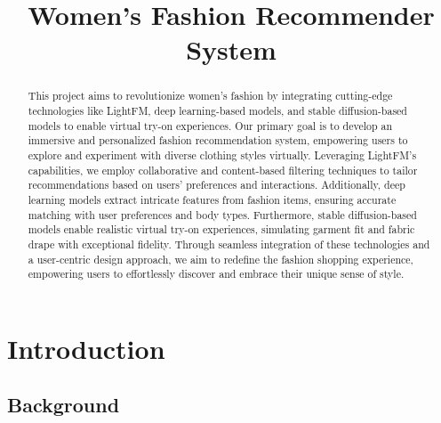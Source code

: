 \documentclass[conference]{IEEEtran}
\begin{document}
\setlength{\parskip}{10pt}

\title{Women's Fashion Recommender System}

\author{
\and

\and

\and
{}
}

\maketitle

\begin{abstract}
This project aims to revolutionize women's fashion by integrating cutting-edge technologies like LightFM, deep learning-based models, and stable diffusion-based models to enable virtual try-on experiences. Our primary goal is to develop an immersive and personalized fashion recommendation system, empowering users to explore and experiment with diverse clothing styles virtually. Leveraging LightFM's capabilities, we employ collaborative and content-based filtering techniques to tailor recommendations based on users' preferences and interactions. Additionally, deep learning models extract intricate features from fashion items, ensuring accurate matching with user preferences and body types. Furthermore, stable diffusion-based models enable realistic virtual try-on experiences, simulating garment fit and fabric drape with exceptional fidelity. Through seamless integration of these technologies and a user-centric design approach, we aim to redefine the fashion shopping experience, empowering users to effortlessly discover and embrace their unique sense of style.

\end{abstract}
\section{Introduction}

\subsection{Background}
\end{document}
